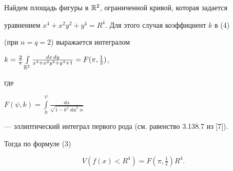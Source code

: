 \begin{exam}


Найдем площадь фигуры в ${\Bbb R}^2$, ограниченной кривой, которая задается


уравнением $x^4+x^2y^2+y^4=R^4$. Для этого случая коэффициент $k$ в (4)


(при $n=q=2$) выражается интегралом


$k=\frac{2}{\pi}\int\limits_{{\Bbb R}^2}\frac {dx\,dy}{x^4+x^2y^2+y^4+1}


=F(\pi,\frac{1}{2})$,


где


$F(\psi,k)=\int\limits_0^\psi\frac {d\alpha}{\sqrt{1-k^2\sin^2\alpha}}$


--- эллиптический интеграл первого рода (см. равенство 3.138.7 из [7]).


Тогда по формуле (3)


$$


V(f(x)<R^4)=F(\pi,\tfrac{1}{2})R^4.


$$


\end{exam}





